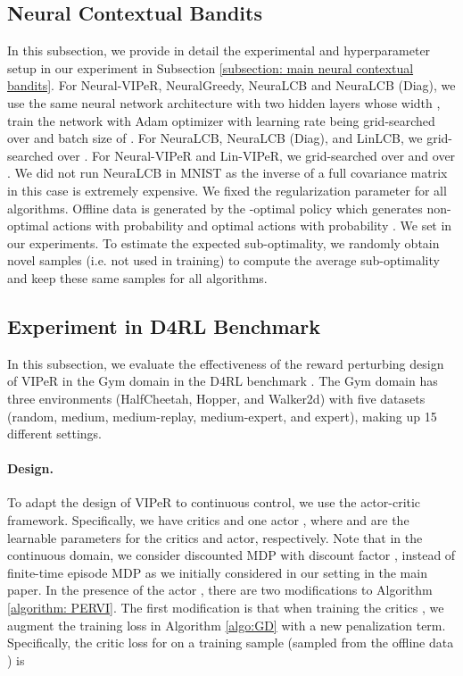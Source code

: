 \documentclass{article} \usepackage{iclr2023/iclr2023_conference,times}
\begin{document}
\subsection{Neural Contextual Bandits}
\label{subsection: extended page for neural contextual bandit experiment}
In this subsection, we provide in detail the experimental and hyperparameter setup in our experiment in Subsection \ref{subsection: main neural contextual bandits}. For Neural-VIPeR, NeuralGreedy, NeuraLCB and NeuraLCB (Diag), we use the same neural network architecture with two hidden layers whose width , train the network with Adam optimizer \citep{kingma2014adam} with learning rate being grid-searched over  and batch size of . For NeuraLCB, NeuraLCB (Diag), and LinLCB, we grid-searched  over . For Neural-VIPeR and Lin-VIPeR, we grid-searched  over  and  over . We did not run NeuraLCB in MNIST as the inverse of a full covariance matrix in this case is extremely expensive. We fixed the regularization parameter  for all algorithms. Offline data is generated by the -optimal policy which generates non-optimal actions with probability  and optimal actions with probability . We set  in our experiments. To estimate the expected sub-optimality, we randomly obtain  novel samples (i.e. not used in training) to compute the average sub-optimality and keep these same samples for all algorithms. 

\subsection{Experiment in D4RL Benchmark}
\label{subsection: d4rl}
In this subsection, we evaluate the effectiveness of the reward perturbing design of VIPeR in the Gym domain in the D4RL benchmark \citep{DBLP:journals/corr/abs-2004-07219}. The Gym domain has three environments (HalfCheetah, Hopper, and Walker2d) with five datasets (random, medium, medium-replay, medium-expert, and expert), making up 15 different settings.


\paragraph{Design.} To adapt the design of VIPeR to continuous control, we use the actor-critic framework. Specifically, we have  critics  and one actor , where  and  are the learnable parameters for the critics and actor, respectively. Note that in the continuous domain, we consider discounted MDP with discount factor , instead of finite-time episode MDP as we initially considered in our setting in the main paper. In the presence of the actor , there are two modifications to Algorithm \ref{algorithm: PERVI}. The first modification is that when training the critics , we augment the training loss in Algorithm \ref{algo:GD} with a new penalization term. Specifically, the critic loss for  on a training sample  (sampled from the offline data ) is 
\end{document}
